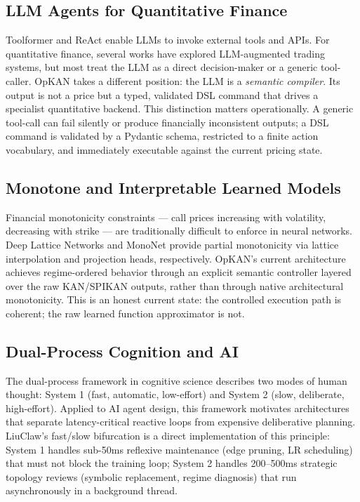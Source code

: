 \documentclass[11pt,a4paper]{article}
\begin{document}
\subsection{LLM Agents for Quantitative Finance}

Toolformer \citep{schick_etal_2023_toolformer} and ReAct \citep{yao_etal_2023_react} enable LLMs to invoke external tools and APIs. For quantitative finance, several works have explored LLM-augmented trading systems, but most treat the LLM as a direct decision-maker or a generic tool-caller. OpKAN takes a different position: the LLM is a \emph{semantic compiler}. Its output is not a price but a typed, validated DSL command that drives a specialist quantitative backend. This distinction matters operationally. A generic tool-call can fail silently or produce financially inconsistent outputs; a DSL command is validated by a Pydantic schema, restricted to a finite action vocabulary, and immediately executable against the current pricing state.

\subsection{Monotone and Interpretable Learned Models}

Financial monotonicity constraints — call prices increasing with volatility, decreasing with strike — are traditionally difficult to enforce in neural networks. Deep Lattice Networks \citep{you_etal_2017_dln} and MonoNet \citep{nguyen_etal_2023_mononet} provide partial monotonicity via lattice interpolation and projection heads, respectively. OpKAN's current architecture achieves regime-ordered behavior through an explicit semantic controller layered over the raw KAN/SPIKAN outputs, rather than through native architectural monotonicity. This is an honest current state: the controlled execution path is coherent; the raw learned function approximator is not.

\subsection{Dual-Process Cognition and AI}

The dual-process framework in cognitive science \citep{kahneman2011thinking} describes two modes of human thought: System 1 (fast, automatic, low-effort) and System 2 (slow, deliberate, high-effort). Applied to AI agent design, this framework motivates architectures that separate latency-critical reactive loops from expensive deliberative planning. LiuClaw's fast/slow bifurcation is a direct implementation of this principle: System 1 handles sub-50ms reflexive maintenance (edge pruning, LR scheduling) that must not block the training loop; System 2 handles 200--500ms strategic topology reviews (symbolic replacement, regime diagnosis) that run asynchronously in a background thread.
\end{document}
